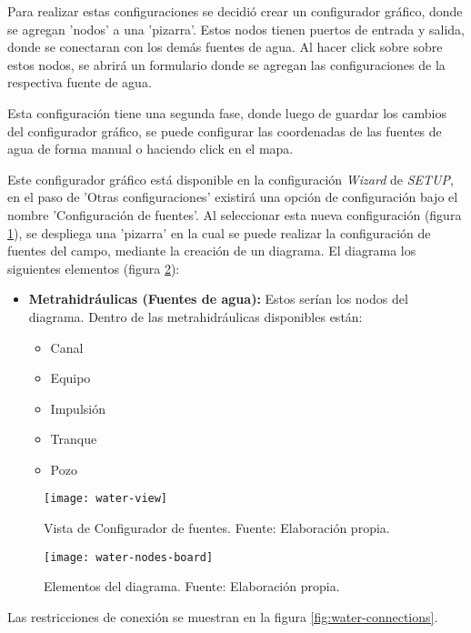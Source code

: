 Para realizar estas configuraciones se decidió crear un configurador gráfico, donde se agregan 'nodos' a una 'pizarra'. Estos nodos tienen puertos de entrada y salida, donde se conectaran con los demás fuentes de agua. Al hacer click sobre sobre estos nodos, se abrirá un formulario donde se agregan las configuraciones de la respectiva fuente de agua.

Esta configuración tiene una segunda fase, donde luego de guardar los cambios del configurador gráfico, se puede configurar las coordenadas de las fuentes de agua de forma manual o haciendo click en el mapa.

Este configurador gráfico está disponible en la configuración \textit{Wizard} de \textit{SETUP}, en el paso de 'Otras configuraciones' existirá una opción de configuración bajo el nombre 'Configuración de fuentes'.
Al seleccionar esta nueva configuración (figura \ref{fig:water-view}), se despliega una 'pizarra' en la cual se puede realizar la configuración de fuentes del campo, mediante la creación de un diagrama. El diagrama los siguientes elementos (figura \ref{fig:water-nodes-board}):
\begin{itemize}
    \item \textbf{Metrahidráulicas (Fuentes de agua):} Estos serían los nodos del diagrama. Dentro de las metrahidráulicas disponibles están:
          \begin{itemize}
              \item Canal
              \item Equipo
              \item Impulsión
              \item Tranque
              \item Pozo
          \end{itemize}   
\end{itemize}

\begin{figure}[H]
	\centering
	\texttt{[image: water-view]}
	\caption{\label{fig:water-view} Vista de Configurador de fuentes. Fuente: Elaboración propia.}
\end{figure}

\begin{figure}[H]
	\centering
	\texttt{[image: water-nodes-board]}
	\caption{\label{fig:water-nodes-board} Elementos del diagrama. Fuente: Elaboración propia.}
\end{figure}

Las restricciones de conexión se muestran en la figura \ref{fig:water-connections}.

